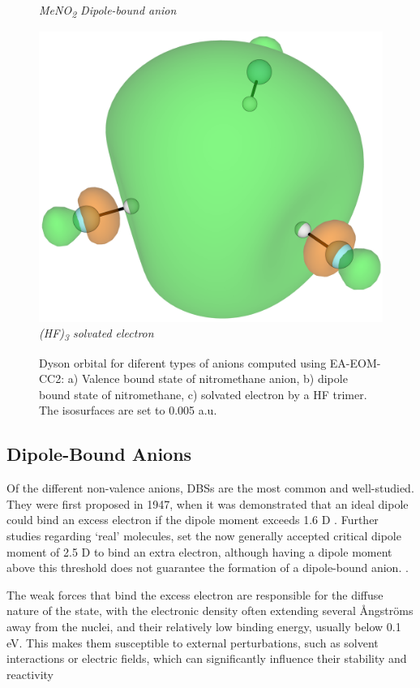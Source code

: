 \begin{figure}[h]
\begin{minipage}[b]{0.30\textwidth}
    \small\emph{MeNO\textsubscript{2} Dipole-bound anion}
  \end{minipage}
  \hfill
  \begin{minipage}[b]{0.3\textwidth}
    \centering
    \includegraphics[width=1.1\textwidth]{chapters/introduction/image/hf3.png}
    \small\emph{(HF)\textsubscript{3} solvated electron}
  \end{minipage}
  \caption[Valence and Non-Valence Anions]{Dyson orbital for diferent types of anions computed using EA-EOM-CC2: a) Valence bound state of nitromethane anion, b) dipole bound state of nitromethane, c) solvated electron by a HF trimer. The isosurfaces are set to 0.005 a.u.}
  \label{fig:AnionTypes}
\end{figure}

\subsection{Dipole-Bound Anions}
Of the different non-valence anions, DBSs are the most common and well-studied. They were first proposed in 1947, when it was demonstrated that an ideal dipole could bind an excess electron if the dipole moment exceeds 1.6 D \cite{fermi1947capture}. Further studies regarding `real' molecules, set the now generally accepted critical dipole moment of 2.5 D to bind an extra electron, although having a dipole moment above this threshold does not guarantee the formation of a dipole-bound anion. \cite{jordan2003theory}.

The weak forces that bind the excess electron are responsible for the diffuse nature of the state, with the electronic density often extending several \r{A}ngstr{\"o}ms away from the nuclei, and their relatively low binding energy, usually below 0.1 eV. This makes them susceptible to external perturbations, such as solvent interactions or electric fields, which can significantly influence their stability and reactivity \cite{schiedt1998anion,jalbout2001dipole,gutowski2002solvated,jordan2003theory,eustis2007photoelectron,simons2008molecular,herbert2015quantum,clarke2025role}

